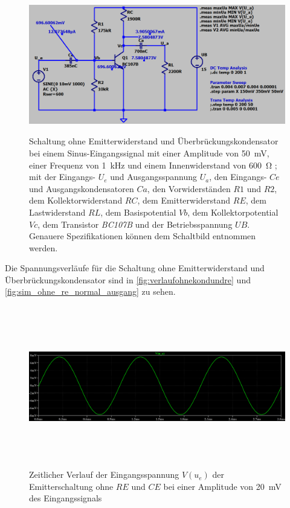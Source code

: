 \documentclass[12pt,english,ngerman]{scrartcl}
\begin{document}
\begin{figure}[H]
    \centering
    \includegraphics[width=\textwidth, height=6cm,keepaspectratio]{./figures/ohnekondundre/schaltungohnere.png}
    \caption{Schaltung ohne Emitterwiderstand und Überbrückungskondensator bei einem Sinus-Eingangssignal
      mit einer Amplitude von \SI{50}{\milli\volt}, einer Frequenz von \SI{1}{\kilo\hertz} und einem
      Innenwiderstand von \SI{600}{\ohm} ; mit der Eingangs- $U_e$ und
      Ausgangsspannung $U_a$, den Eingangs- $Ce$ und Ausgangskondensatoren $Ca$, den
      Vorwiderständen $R1$ und $R2$, dem Kollektorwiderstand $RC$, dem
      Emitterwiderstand $RE$, dem Lastwiderstand $RL$, dem Basispotential $Vb$, dem
      Kollektorpotential $Vc$, dem Transistor \textit{BC107B} und der
      Betriebsspannung $UB$. Genauere Spezifikationen können dem Schaltbild entnommen
      werden.}
    \label{fig:schatlungohnekundre}
\end{figure}

Die Spannungsverläufe für die Schaltung ohne Emitterwiderstand und
Überbrückungskondensator sind in \autoref{fig:verlaufohnekondundre} und \autoref{fig:sim_ohne_re_normal_ausgang} zu
sehen.

\begin{figure}[H]
    \centering
    \includegraphics[width=\linewidth, height=7cm]{./figures/ohnekondundre/eingangssignal10mv.png}
    \caption{Zeitlicher Verlauf der Eingangsspannung $V(u_e)$ 
    der Emitterschaltung ohne $RE$ und $CE$ bei einer Amplitude von
  \SI{20}{mV} des Eingangssignals}
    \label{fig:verlaufohnekondundre}
\end{figure}
\end{document}
